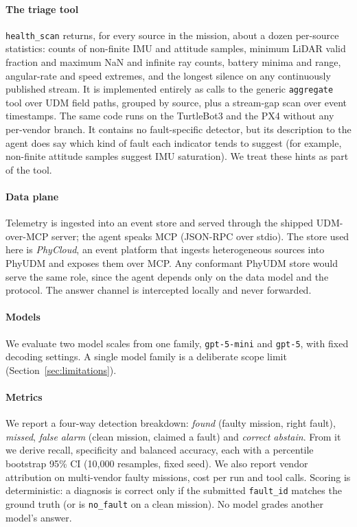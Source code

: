 \documentclass[conference]{IEEEtran}
\newcommand{\udm}{PhyUDM}
\newcommand{\hs}{\texttt{health\_scan}}
\begin{document}
\paragraph{The triage tool} \hs{} returns, for every source in the mission, about a
dozen per-source statistics: counts of non-finite IMU and attitude samples, minimum
LiDAR valid fraction and maximum NaN and infinite ray counts, battery minima and
range, angular-rate and speed extremes, and the longest silence on any
continuously published stream. It is implemented entirely as calls to the generic
\texttt{aggregate} tool over UDM field paths, grouped by source, plus a stream-gap
scan over event timestamps. The same code runs on the TurtleBot3 and the PX4
without any per-vendor branch. It contains no fault-specific detector, but its
description to the agent does say which kind of fault each indicator tends to
suggest (for example, non-finite attitude samples suggest IMU saturation). We treat
these hints as part of the tool.

\paragraph{Data plane} Telemetry is ingested into an event store and served
through the shipped UDM-over-MCP server; the agent speaks MCP (JSON-RPC over
stdio). The store used here is \emph{PhyCloud}, an event platform that ingests
heterogeneous sources into \udm{} and exposes them over MCP. Any conformant \udm{}
store would serve the same role, since the agent depends only on the data model and
the protocol. The answer channel is intercepted locally and never forwarded.

\paragraph{Models} We evaluate two model scales from one family,
\texttt{gpt-5-mini} and \texttt{gpt-5}, with fixed decoding settings. A single
model family is a deliberate scope limit (Section~\ref{sec:limitations}).

\paragraph{Metrics} We report a four-way detection breakdown: \emph{found} (faulty
mission, right fault), \emph{missed}, \emph{false alarm} (clean mission, claimed a
fault) and \emph{correct abstain}. From it we derive recall, specificity and
balanced accuracy, each with a percentile bootstrap 95\% CI (10{,}000 resamples,
fixed seed). We also report vendor attribution on multi-vendor faulty missions,
cost per run and tool calls. Scoring is deterministic: a diagnosis is correct only
if the submitted \texttt{fault\_id} matches the ground truth (or is
\texttt{no\_fault} on a clean mission). No model grades another model's answer.
\end{document}
